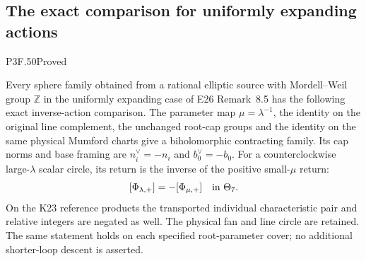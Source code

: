 \subsection{The exact comparison for uniformly expanding actions}
\begin{statement}{P3F.50}{Proved}

Every sphere family obtained from a rational elliptic source with
Mordell--Weil group \(\mathbb Z\) in the uniformly expanding case
of E26 Remark~8.5 has the following exact inverse-action comparison.
The parameter map \(\mu=\lambda^{-1}\), the identity on the original
line complement, the unchanged root-cap groups and the identity on
the same physical Mumford charts give a biholomorphic contracting
family. Its cap norms and base framing are
\(n_i^\vee=-n_i\) and \(b_0^\vee=-b_0\).
For a counterclockwise large-\(\lambda\) scalar circle, its return is
the inverse of the positive small-\(\mu\) return:
\[
 [\Phi_{\lambda,+}]=-[\Phi_{\mu,+}]\quad\hbox{in }\Theta_7.
\]
On the K23 reference products the transported individual characteristic
pair and relative integers are negated as well.
The physical fan and line circle are retained.
The same statement holds on each specified root-parameter cover;
no additional shorter-loop descent is asserted.
\end{statement}
